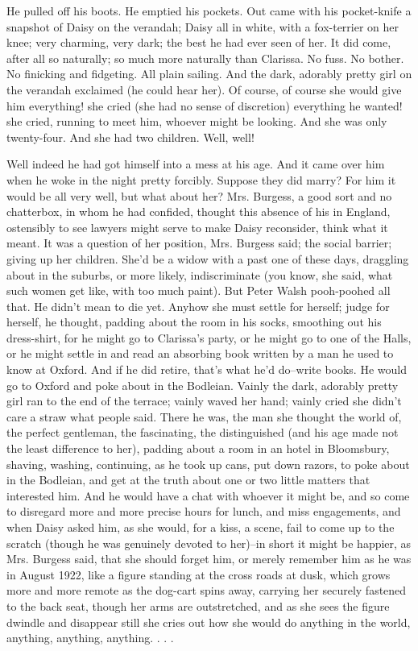 \documentclass[lang=cn,10pt]{elegantbook}
\begin{document}
He pulled off his boots.  He emptied his pockets.  Out came with
his pocket-knife a snapshot of Daisy on the verandah; Daisy all in
white, with a fox-terrier on her knee; very charming, very dark;
the best he had ever seen of her.  It did come, after all so
naturally; so much more naturally than Clarissa.  No fuss.  No
bother.  No finicking and fidgeting.  All plain sailing.  And the
dark, adorably pretty girl on the verandah exclaimed (he could hear
her).  Of course, of course she would give him everything! she
cried (she had no sense of discretion) everything he wanted! she
cried, running to meet him, whoever might be looking.  And she was
only twenty-four.  And she had two children.  Well, well!

Well indeed he had got himself into a mess at his age.  And it came
over him when he woke in the night pretty forcibly.  Suppose they
did marry?  For him it would be all very well, but what about her?
Mrs. Burgess, a good sort and no chatterbox, in whom he had
confided, thought this absence of his in England, ostensibly to see
lawyers might serve to make Daisy reconsider, think what it meant.
It was a question of her position, Mrs. Burgess said; the social
barrier; giving up her children.  She'd be a widow with a past one
of these days, draggling about in the suburbs, or more likely,
indiscriminate (you know, she said, what such women get like, with
too much paint).  But Peter Walsh pooh-poohed all that.  He didn't
mean to die yet.  Anyhow she must settle for herself; judge for
herself, he thought, padding about the room in his socks, smoothing
out his dress-shirt, for he might go to Clarissa's party, or he
might go to one of the Halls, or he might settle in and read an
absorbing book written by a man he used to know at Oxford.  And if
he did retire, that's what he'd do--write books.  He would go to
Oxford and poke about in the Bodleian.  Vainly the dark, adorably
pretty girl ran to the end of the terrace; vainly waved her hand;
vainly cried she didn't care a straw what people said.  There he
was, the man she thought the world of, the perfect gentleman, the
fascinating, the distinguished (and his age made not the least
difference to her), padding about a room in an hotel in Bloomsbury,
shaving, washing, continuing, as he took up cans, put down razors,
to poke about in the Bodleian, and get at the truth about one or
two little matters that interested him.  And he would have a chat
with whoever it might be, and so come to disregard more and more
precise hours for lunch, and miss engagements, and when Daisy asked
him, as she would, for a kiss, a scene, fail to come up to the
scratch (though he was genuinely devoted to her)--in short it might
be happier, as Mrs. Burgess said, that she should forget him, or
merely remember him as he was in August 1922, like a figure
standing at the cross roads at dusk, which grows more and more
remote as the dog-cart spins away, carrying her securely fastened
to the back seat, though her arms are outstretched, and as she sees
the figure dwindle and disappear still she cries out how she would
do anything in the world, anything, anything, anything. . . .
\end{document}
